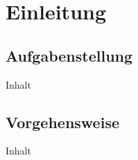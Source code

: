 \chapter{Einleitung\label{chap1:Erstes-Kapitel}}

\section{Aufgabenstellung\label{sec1.2:Unterpunkt-2}}

Inhalt

\section{Vorgehensweise\label{sec1.3:Unterpunkt-3}}

Inhalt